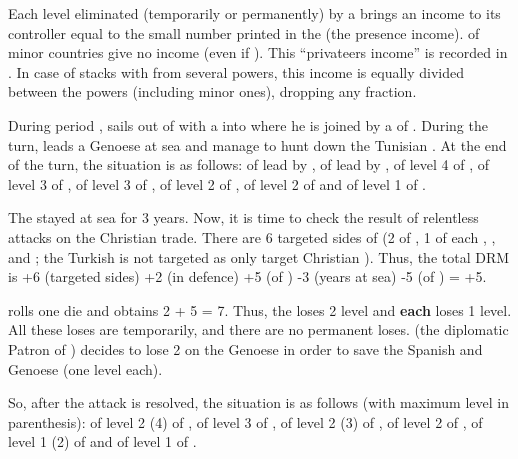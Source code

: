 Each level eliminated (temporarily or
permanently) by a \corsaire brings an income to its controller equal to the
small number printed in the \STZ (the presence income). \corsaire of minor
countries give no income (even if \VASSAL).
\bparag This ``privateers income'' is recorded in .
\bparag In case of stacks with \corsaire from several powers, this income is
equally divided between the powers (including minor ones), dropping any
fraction.

\begin{exemple} During period ,
   sails out of \villeAlger with a
  \corsaire\faceplus into  where he is joined by a
  \corsaire\facemoins of \paysTunisie. During the turn,  leads a Genoese \FLEET\facemoins at sea and manage to hunt down the
  Tunisian \corsaire. At the end of the turn, the situation is as follows:
  \corsaire\faceplus of \paysAlgerie lead by ,
  \FLEET\facemoins of \paysGenes lead by ,
  \TradeFLEET\faceplus of level 4 of \FRA, \TradeFLEET\facemoins of level 3 of
  \paysHollande, \TradeFLEET\facemoins of level 3 of \paysGenes,
  \TradeFLEET\facemoins of level 2 of \SPA, \TradeFLEET\facemoins of level 2
  of \VEN and \TradeFLEET\facemoins of level 1 of \TUR.

  The \corsaire stayed at sea for 3 years. Now, it is time to check the result
  of  relentless attacks on the Christian trade. There are 6
  targeted sides of \TradeFLEET (2 of \FRA, 1 of each \paysHollande,
  \paysGenes, \HIS and \VEN; the Turkish \TradeFLEET is not targeted as
  \Barbaresques only target Christian \TradeFLEET). Thus, the total DRM is +6
  (targeted sides) +2 (\FLEET\facemoins in defence) +5 (\Man of ) -3 (years at sea) -5 (\Man of ) = +5.

  \TUR rolls one die and obtains 2 + 5 = 7. Thus, the \TradeFLEET\faceplus
  loses 2 level and \textbf{each} \TradeFLEET\facemoins loses 1 level. All
  these loses are temporarily, and there are no permanent loses. \HIS (the
  diplomatic Patron of \paysGenes) decides to lose 2 \NGD on the Genoese
  \FLEET in order to save the Spanish and Genoese \TradeFLEET (one level
  each).

  So, after the attack is resolved, the situation is as follows (with maximum
  level in parenthesis): \TradeFLEET\facemoins of level 2 (4) of \FRA,
  \TradeFLEET\facemoins of level 3 of \paysGenes, \TradeFLEET\facemoins of
  level 2 (3) of \paysHollande, \TradeFLEET\facemoins of level 2 of \HIS,
  \TradeFLEET\facemoins of level 1 (2) of \VEN and \TradeFLEET\facemoins of
  level 1 of \TUR.


\end{exemple}
